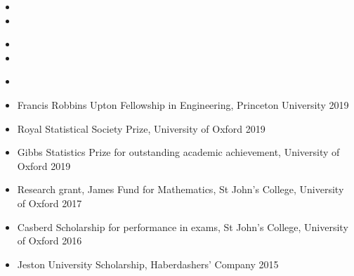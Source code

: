 \documentclass[
  date,
  number,
]{wgu-cv}
\begin{document}
\begin{itemize}
  \item {}
	\item {}
\end{itemize}


\begin{itemize}
  \item {}
  \item {}
\end{itemize}


\begin{itemize}
  \item {}
\end{itemize}


\pagebreak

\begin{itemize}
  \item Francis Robbins Upton Fellowship in Engineering,
    Princeton University
    \hfill 2019%
  \item Royal Statistical Society Prize,
    University of Oxford
    \hfill 2019%
  \item Gibbs Statistics Prize for outstanding academic achievement,
    University of Oxford
    \hfill 2019%
	\item Research grant, James Fund for Mathematics,
    St John's College, University of Oxford
    \hfill 2017%
	\item Casberd Scholarship for performance in exams,
    St John's College, University of Oxford
    \hfill 2016%
  \item Jeston University Scholarship,
    Haberdashers' Company
    \hfill 2015%
\end{itemize}



\end{document}
